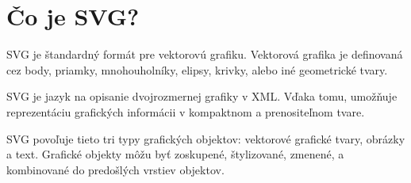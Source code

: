 %






%
%
%





\section{Čo je SVG?}
\ac{SVG} je štandardný formát pre vektorovú grafiku. Vektorová grafika je definovaná cez body, priamky, mnohouholníky, elipsy, krivky, alebo iné geometrické tvary.  

\acs{SVG} je jazyk na opisanie dvojrozmernej grafiky v   \ac*{XML}. Vďaka tomu, umožňuje reprezentáciu grafických informácii v kompaktnom a prenositeľnom tvare.

 SVG povoľuje tieto tri typy grafických objektov: vektorové grafické tvary, obrázky a text. 
Grafické objekty môžu byť zoskupené, štylizované, zmenené, a kombinované do predošlých vrstiev objektov. 


